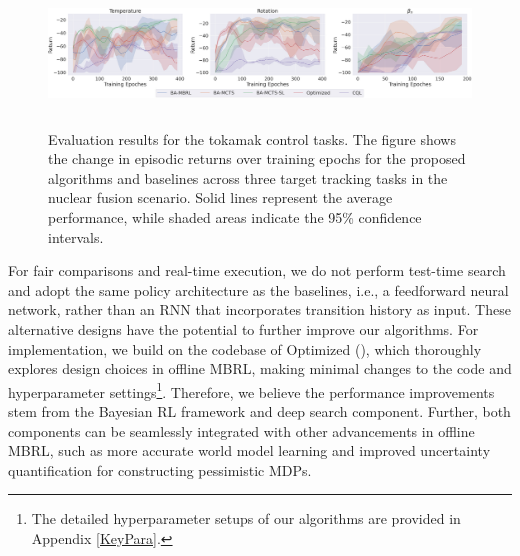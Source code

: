 \begin{figure}[t]
    \centering
    \includegraphics[width=\linewidth, height=1.5in]{nf_return-eps-converted-to.pdf} %
    \caption{Evaluation results for the tokamak control tasks. The figure shows the change in episodic returns over training epochs for the proposed algorithms and baselines across three target tracking tasks in the nuclear fusion scenario. Solid lines represent the average performance, while shaded areas indicate the 95\% confidence intervals.}
    \label{fig:2}
\end{figure}

For fair comparisons and real-time execution, we do not perform test-time search and adopt the same policy architecture as the baselines, i.e., a feedforward neural network, rather than an RNN that incorporates transition history as input. These alternative designs have the potential to further improve our algorithms. For implementation, we build on the codebase of Optimized (\cite{DBLP:conf/iclr/LuBPOR22}), which thoroughly explores design choices in offline MBRL, making minimal changes to the code and hyperparameter settings\footnote{The detailed hyperparameter setups of our algorithms are provided in Appendix \ref{KeyPara}.}. Therefore, we believe the performance improvements stem from the Bayesian RL framework and deep search component. Further, both components can be seamlessly integrated with other advancements in offline MBRL, such as more accurate world model learning and improved uncertainty quantification for constructing pessimistic MDPs. 

